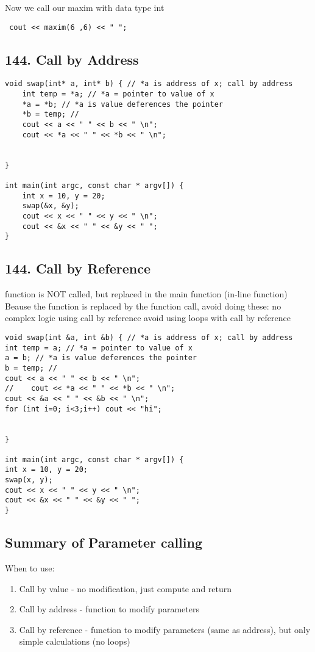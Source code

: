 \documentclass[a4paper,12pt]{book}
\begin{document}
Now we call our maxim with data type int
\begin{lstlisting}
 cout << maxim(6 ,6) << " ";
\end{lstlisting}


\subsection{144. Call by Address}
\begin{lstlisting}
void swap(int* a, int* b) { // *a is address of x; call by address
	int temp = *a; // *a = pointer to value of x
	*a = *b; // *a is value deferences the pointer
	*b = temp; //
	cout << a << " " << b << " \n";
	cout << *a << " " << *b << " \n";
	
	
}

int main(int argc, const char * argv[]) {
	int x = 10, y = 20;
	swap(&x, &y);
	cout << x << " " << y << " \n";
	cout << &x << " " << &y << " ";
}

\end{lstlisting}



\subsection{144. Call by Reference}
function is NOT called, but replaced in the main function (in-line function)
Beause the function is replaced by the function call, avoid doing these:
no complex logic using call by reference
avoid using loops with call by reference

\begin{lstlisting}
void swap(int &a, int &b) { // *a is address of x; call by address
int temp = a; // *a = pointer to value of x
a = b; // *a is value deferences the pointer
b = temp; //
cout << a << " " << b << " \n";
//    cout << *a << " " << *b << " \n";
cout << &a << " " << &b << " \n";
for (int i=0; i<3;i++) cout << "hi";


}

int main(int argc, const char * argv[]) {
int x = 10, y = 20;
swap(x, y);
cout << x << " " << y << " \n";
cout << &x << " " << &y << " ";
}

\end{lstlisting}

\subsection{Summary of Parameter calling}
When to use:
\begin{enumerate}
\item Call by value - no modification, just compute and return
\item Call by address - function to modify parameters
\item Call by reference - function to modify parameters (same as address), but only simple calculations (no loops)
\end{enumerate}
\end{document}
